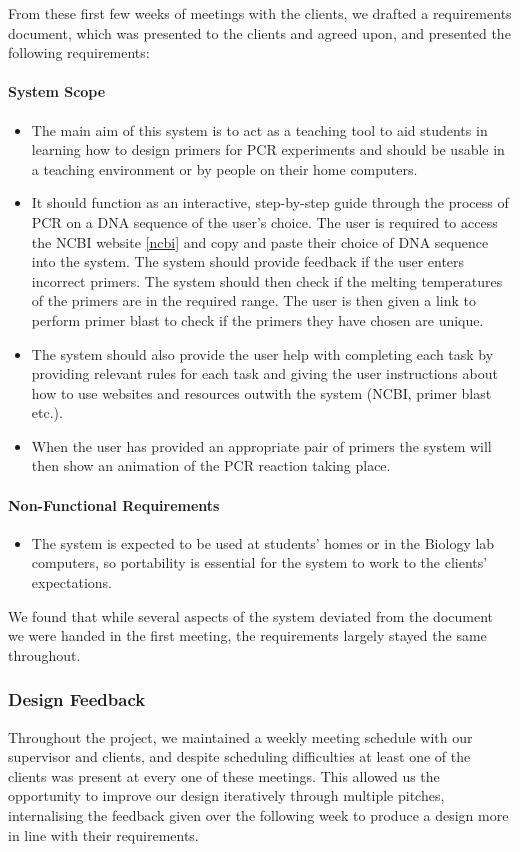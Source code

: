 From these first few weeks of meetings with the clients, we drafted a
requirements document, which was presented to the clients and agreed upon,
and presented the following requirements:

\paragraph{System Scope}
\begin{itemize}
\item{The main aim of this system is to act as a teaching tool to aid 
students in learning how to design primers for PCR experiments and 
should be usable in a teaching environment or by people on their home 
computers.}
\item{It should function as an interactive, step-by-step guide through 
the process of PCR on a DNA sequence of the user's choice. The user is 
required to access the NCBI website \ref{ncbi} and copy and paste
their choice of DNA sequence into the system.
The system should provide feedback if the user enters incorrect
primers.
The system should then check if the melting temperatures of the
primers are in the required range.
The user is then given a link to perform primer blast to check if the
primers they have chosen are unique.}
\item{The system should also provide the user help with completing each 
task by providing relevant rules for each task and giving the user 
instructions about how to use websites and resources outwith the system 
(NCBI, primer blast etc.).}
\item{When the user has provided an appropriate pair of primers the 
system will then show an animation of the PCR reaction taking place.}
\end{itemize}
\paragraph{Non-Functional Requirements}
\begin{itemize}
\item{The system is expected to be used at students’ homes or in the 
Biology lab computers, so portability is essential for the system to 
work to the clients’ expectations.}
\end{itemize}
We found that while several aspects of the system deviated from the
document we were handed in the first meeting, the requirements largely
stayed the same throughout.

\subsubsection{Design Feedback}
Throughout the project, we maintained a weekly meeting schedule with our
supervisor and clients, and despite scheduling difficulties at least one
of the clients was present at every one of these meetings. This allowed
us the opportunity to improve our design iteratively through multiple
pitches, internalising the feedback given over the following week to 
produce a design more in line with their requirements.

